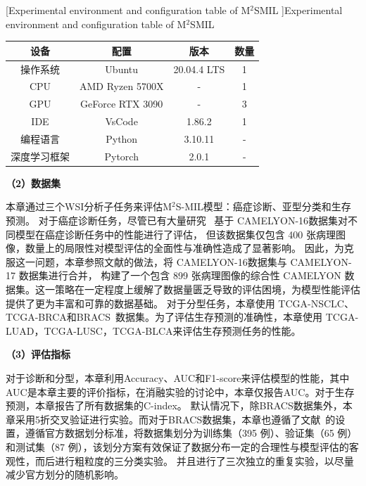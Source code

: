 \begin{table}[h!]
  \small    %
  \centering
  [Experimental environment and configuration table of M$^2$SMIL ]{Experimental environment and configuration table of M$^2$SMIL}
  \begin{tabularx}{\textwidth}{CcCC}
  \toprule
  设备     & 配置               & 版本          & 数量 \\ 
  \midrule
  操作系统   & Ubuntu           & 20.04.4 LTS & 1  \\
  CPU    & AMD Ryzen 5700X  & -           & 1  \\
  GPU    & GeForce RTX 3090 & -           & 3  \\
  IDE    & VsCode           & 1.86.2      & 1  \\
  编程语言   & Python           & 3.10.11       & -  \\
  深度学习框架 & Pytorch          & 2.0.1       & -  \\
  \bottomrule
  \end{tabularx}
  \label{table3: env}
  \end{table}

\textbf{（2）数据集}

本章通过三个WSI分析子任务来评估M$^2$S-MIL模型：癌症诊断、亚型分类和生存预测。
对于癌症诊断任务，尽管已有大量研究~\cite{li2021dual,shao2021transmil,tang2023multiple} 基于 CAMELYON-16\cite{bejnordi2017diagnostic}数据集对不同模型在癌症诊断任务中的性能进行了评估，
但该数据集仅包含 400 张病理图像，数量上的局限性对模型评估的全面性与准确性造成了显著影响。
因此，为克服这一问题，本章参照文献\cite{lu2021data,tang2024feature}的做法，将 CAMELYON-16\cite{bejnordi2017diagnostic}数据集与 CAMELYON-17\cite{bandi2018detection} 数据集进行合并，
构建了一个包含 899 张病理图像的综合性 CAMELYON 数据集。这一策略在一定程度上缓解了数据量匮乏导致的评估困境，为模型性能评估提供了更为丰富和可靠的数据基础。
对于分型任务，本章使用 TCGA-NSCLC、TCGA-BRCA和BRACS~\cite{brancati2022bracs}数据集。为了评估生存预测的准确性，本章使用 TCGA-LUAD，TCGA-LUSC，TCGA-BLCA来评估生存预测任务的性能。

\textbf{（3）评估指标}

对于诊断和分型，本章利用Accuracy、AUC和F1-score来评估模型的性能，其中AUC是本章主要的评价指标，在消融实验的讨论中，本章仅报告AUC。对于生存预测，本章报告了所有数据集的C-index。
默认情况下，除BRACS数据集外，本章采用5折交叉验证进行实验。而对于BRACS数据集，本章也遵循了文献~\cite{chen2024towards}的设置，遵循官方数据划分标准，将数据集划分为训练集（395 例）、验证集（65 例）和测试集（87 例），该划分方案有效保证了数据分布一定的合理性与模型评估的客观性，而后进行粗粒度的三分类实验。
并且进行了三次独立的重复实验，以尽量减少官方划分的随机影响。%

